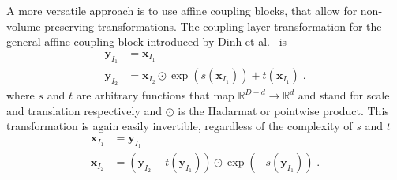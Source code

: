 A more versatile approach is to use affine coupling blocks, that allow for
non-volume preserving transformations. The coupling layer transformation for
the general affine coupling block introduced by Dinh et
al.~\citep{dinhDensityEstimationUsing2017} is
\begin{equation}
    \begin{aligned}%
        \label{eq:affine_coupling_transform}
        \mathbf{y}_{I_1} &= \mathbf{x}_{I_1} \\
        \mathbf{y}_{I_2} &= \mathbf{x}_{I_2} \odot \exp ( s(\mathbf{x}_{I_1}))
        + t(\mathbf{x}_{I_1})\;.
    \end{aligned}
\end{equation}
where $s$ and $t$ are arbitrary functions that map $\mathbb{R}^{D-d}
\rightarrow \mathbb{R}^d$ and stand for scale and translation respectively and
$\odot$ is the Hadarmat or pointwise product.
This transformation is again easily invertible, regardless of the complexity of
$s$ and $t$
\begin{equation}
    \begin{aligned}%
        \label{eq:inv_affine_coupling_transform}
        \mathbf{x}_{I_1} &= \mathbf{y}_{I_1} \\
        \mathbf{x}_{I_2} &= (\mathbf{y}_{I_2} - t(\mathbf{y}_{I_1})) \odot \exp
        (-s(\mathbf{y}_{I_1}))\;.
    \end{aligned}
\end{equation}

